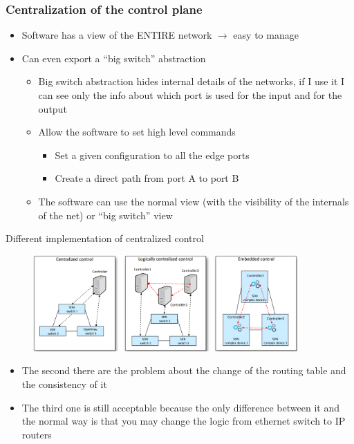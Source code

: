 \documentclass{article}
\begin{document}
\subsubsection{Centralization of the control plane}
  \begin{itemize}
    \item Software has a view of the ENTIRE network $\rightarrow$ easy to manage
    \item Can even export a “big switch” abstraction
      \begin{itemize}
        \item Big switch abstraction hides internal details of the networks, if I use it I can see only the info about which port is used for the input and for the output
        \item Allow the software to set high level commands
          \begin{itemize}
            \item Set a given configuration to all the edge ports 
            \item Create a direct path from port A to port B
          \end{itemize}
        \item The software can use the normal view (with the visibility of the internals of the net) or “big switch” view
      \end{itemize}
  \end{itemize}

Different implementation of centralized control
\begin{figure}[h]
    \centering
    \includegraphics[width=0.90\textwidth]{figure/different_centralized_control.png}
\end{figure}
  \begin{itemize}
    \item The second there are the problem about the change of the routing table and the consistency of it
    \item The third one is still acceptable because the only difference between it and the normal way is that you may change the logic from ethernet switch to IP routers
  \end{itemize}
\end{document}
